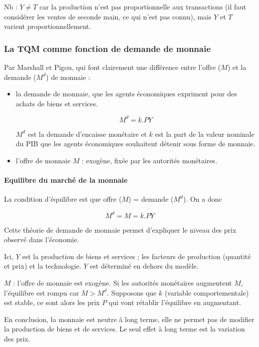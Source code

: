 	Nb : $Y \neq T$ car la production n'est pas proportionnelle aux transactions (il faut considérer les ventes de seconde main, ce qui n'est pas connu), mais $Y$ et $T$ varient proportionnellement.
	
	
	\subsubsection{La TQM comme fonction de demande de monnaie}
	
	Par Marshall et Pigou, qui font clairement une différence entre l'offre ($M$) et la demande ($M^d$) de monnaie :
	
	\begin{itemize}
		\item la demande de monnaie, que les agents économiques expriment pour des achats de biens et services.
		
		$$M^d =k.PY$$
		
		$M^d$ est la demande d'encaisse monétaire et $k$ est la part de la valeur nominale du PIB que les agents économiques souhaitent détenir sous forme de monnaie.
		
		\item l'offre de monnaie $M$ : exogène, fixée par les autorités monétaires.
	\end{itemize}
	
	\paragraph{Equilibre du marché de la monnaie} La condition d'équilibre est que offre ($M$) = demande ($M^d$). On a donc 
	
	$$M^d = M = k.PY$$
	
	Cette théorie de demande de monnaie permet d'expliquer le niveau des prix observé dans l'économie.
	
	Ici, $Y$ est la production de biens et services ; les facteurs de production (quantité et prix) et la technologie. $Y$ est déterminé en dehors du modèle.
	
	$M$ : l'offre de monnaie est exogène. Si les autorités monétaires augmentent $M$, l'équilibre est rompu car $M > M^d$. Supposons que $k$ (variable comportementale) est stable, ce sont alors les prix $P$ qui vont rétablir l'équilibre en augmentant.
	
	En conclusion, la monnaie est neutre à long terme, elle ne permet pas de modifier la production de biens et de services. Le seul effet à long terme est la variation des prix.
	
